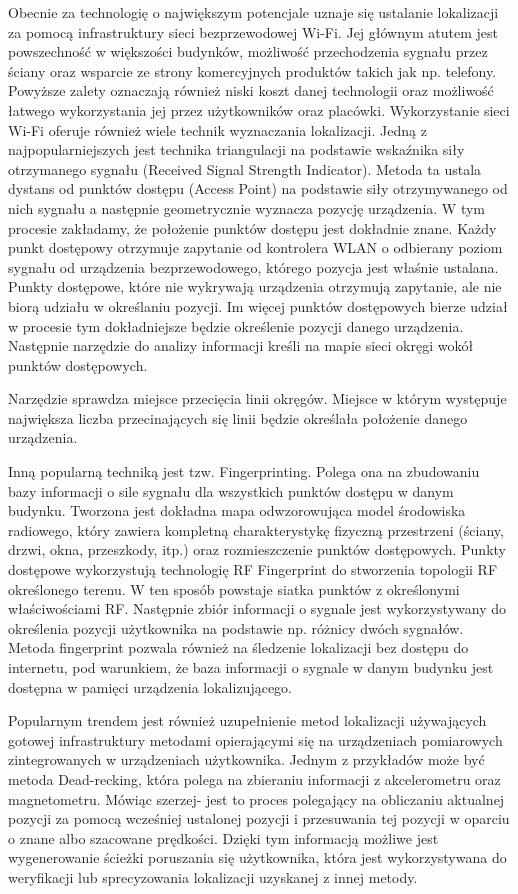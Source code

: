 \documentclass[11pt]{article}
\begin{document}
		Obecnie za technologię o największym potencjale uznaje się ustalanie lokalizacji za pomocą infrastruktury sieci bezprzewodowej Wi-Fi. Jej głównym atutem jest powszechność w większości budynków, możliwość przechodzenia sygnału przez ściany oraz wsparcie ze strony komercyjnych produktów takich jak np. telefony. Powyższe zalety oznaczają również niski koszt danej technologii oraz możliwość łatwego wykorzystania jej przez użytkowników oraz placówki. Wykorzystanie sieci Wi-Fi oferuje również wiele technik wyznaczania lokalizacji. Jedną z najpopularniejszych jest technika triangulacji na podstawie wskaźnika siły otrzymanego sygnału (Received Signal Strength Indicator). Metoda ta ustala dystans od punktów dostępu (Access Point) na podstawie siły otrzymywanego od nich sygnału a następnie geometrycznie wyznacza pozycję urządzenia. W tym procesie zakładamy, że położenie punktów dostępu jest dokładnie znane. Każdy punkt dostępowy otrzymuje zapytanie od kontrolera WLAN o odbierany poziom sygnału od urządzenia bezprzewodowego, którego pozycja jest właśnie ustalana. Punkty dostępowe, które nie wykrywają urządzenia otrzymują zapytanie, ale nie biorą udziału w określaniu pozycji. Im więcej punktów dostępowych bierze udział w procesie tym dokładniejsze będzie określenie pozycji danego urządzenia. Następnie narzędzie do analizy informacji kreśli na mapie sieci okręgi wokół punktów \mbox{dostępowych.} 
		
		\mbox{Narzędzie} sprawdza miejsce przecięcia linii okręgów. Miejsce w którym występuje największa liczba przecinających się linii będzie określała położenie danego urządzenia.
		
		Inną popularną techniką jest tzw. Fingerprinting. Polega ona na zbudowaniu bazy informacji o sile sygnału dla wszystkich punktów dostępu w danym budynku. Tworzona jest dokładna mapa odwzorowująca model środowiska radiowego, który zawiera kompletną charakterystykę fizyczną przestrzeni (ściany, drzwi, okna, przeszkody, itp.) oraz rozmieszczenie punktów dostępowych.
		Punkty dostępowe wykorzystują technologię RF Fingerprint do stworzenia topologii RF określonego terenu. W ten sposób powstaje siatka punktów z określonymi właściwościami RF. Następnie zbiór informacji o sygnale jest wykorzystywany do określenia pozycji użytkownika na podstawie np. różnicy dwóch sygnałów. Metoda fingerprint pozwala również na śledzenie lokalizacji bez dostępu do internetu, pod warunkiem, że baza informacji o sygnale w danym budynku jest dostępna w pamięci urządzenia lokalizującego.
		
		Popularnym trendem jest również uzupełnienie metod lokalizacji używających gotowej infrastruktury metodami opierającymi się na urządzeniach pomiarowych zintegrowanych w urządzeniach użytkownika. Jednym z przykładów może być metoda Dead-recking, która polega na zbieraniu informacji z akcelerometru oraz magnetometru. Mówiąc szerzej- jest to proces polegający na obliczaniu aktualnej pozycji za pomocą wcześniej ustalonej pozycji i przesuwania tej pozycji w oparciu o znane albo szacowane prędkości. Dzięki tym informacją możliwe jest wygenerowanie ścieżki poruszania się użytkownika, która jest wykorzystywana do weryfikacji lub sprecyzowania lokalizacji uzyskanej z innej metody. 
		
\end{document}
